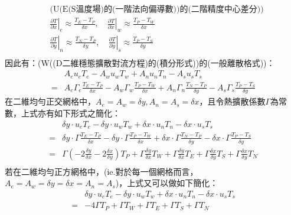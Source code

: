 \documentclass[12pt]{article}
\begin{document}
\begin{equation*}\begin{split}
    &\text{(U(E(S溫度場)的(一階法向偏導數))的(二階精度中心差分))}\\[1.5ex]
    &\left.\frac{\partial T}{\partial x}\right|_{e} \approx \frac{T_{E}-T_{P}}{\delta x}, \quad \left.\frac{\partial T}{\partial x}\right|_{w} \approx \frac{T_{P}-T_{W}}{\delta x}\\[1.5ex]
    &\left.\frac{\partial T}{\partial y}\right|_{n} \approx \frac{T_{N}-T_{P}}{\delta y}, \quad \left.\frac{\partial T}{\partial y}\right|_{s} \approx \frac{T_{P}-T_{S}}{\delta y}\\[1.5ex]
\end{split}\end{equation*}
\noindent 因此有：(W((D二維穩態擴散對流方程)的(積分形式))的(一般離散格式))：
\begin{equation}\begin{split}
     &A_{e}u_{e}T_{e} - A_{w}u_{w}T_{w}+A_{n}u_{n}T_{n} - A_{s}u_{s}T_{s} \\[1.5ex]
    =& A_{e}\Gamma_{e}\frac{T_{E}-T_{P}}{\delta x}-A_{w}\Gamma_{w}\frac{T_{P}-T_{W}}{\delta x}+A_{n}\Gamma_{n}\frac{T_{N}-T_{P}}{\delta y}-A_{s}\Gamma_{s}\frac{T_{P}-T_{S}}{\delta y}
\end{split}\end{equation}
\noindent 在二維均勻正交網格中，$A_{e} =A_{w} = \delta y , A_{n} = A_{s} = \delta x$，且令熱擴散係數$\Gamma$為常數，上式亦有如下形式之簡化：
\begin{equation}\begin{split}
     &\delta y\cdot  u_{e}T_{e} - \delta y\cdot u_{w}T_{w}+\delta x\cdot u_{n}T_{n} - \delta x\cdot u_{s}T_{s} \\[1.5ex]
    =& \delta y\cdot \Gamma\frac{T_{E}-T_{P}}{\delta x}-\delta y\cdot \Gamma\frac{T_{P}-T_{W}}{\delta x}+\delta x\cdot \Gamma\frac{T_{N}-T_{P}}{\delta y}-\delta x\cdot \Gamma\frac{T_{P}-T_{S}}{\delta y}\\[1.5ex]
    =& \Gamma(-2\frac{\delta y}{\delta x}-2\frac{\delta x}{\delta y})T_{P} + \Gamma\frac{\delta y}{\delta x}T_{W} + \Gamma\frac{\delta y}{\delta x}T_{E} + \Gamma\frac{\delta x}{\delta y}T_{S} + \Gamma\frac{\delta x}{\delta y}T_{N} \\[1.5ex]
\end{split}\end{equation}
\noindent 若在二維均勻正方網格中，(ie.對於每一個網格而言，$A_{e} = A_{w} = \delta y = \delta x = A_{n} = A_{s}$)，上式又可以做如下簡化：
\begin{equation}\label{eq:general}\begin{split}
    &\delta y\cdot u_{e}T_{e} - \delta y\cdot u_{w}T_{w}+\delta x\cdot u_{n}T_{n} - \delta x\cdot u_{s}T_{s} \\[1.5ex]
    =& -4\Gamma T_{P} + \Gamma T_{W} + \Gamma T_{E} + \Gamma  T_{S} + \Gamma T_{N} \\[1.5ex]
\end{split}\end{equation}
\end{document}
